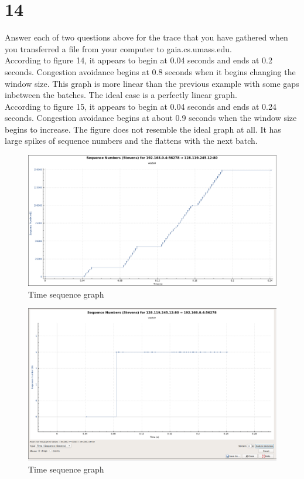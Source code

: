 \documentclass{article}
\begin{document}
\section*{14}
Answer each of two questions above for the trace that you have gathered when
you transferred a file from your computer to gaia.cs.umass.edu.\\
\newline According to figure 14, it appears to begin at 0.04 seconds and ends at 0.2 seconds.  Congestion avoidance begins at 0.8 seconds when it begins changing the window size.  This graph is more linear than the previous example with some gaps inbetween the batches.  The ideal case is a perfectly linear graph.\\
\newline According to figure 15, it appears to begin at 0.04 seconds and ends at 0.24 seconds.  Congestion avoidance begins at about 0.9 seconds when the window size begins to increase.  The figure does not resemble the ideal graph at all.  It has large spikes of sequence numbers and the flattens with the next batch.\\
\begin{figure}[h!]
\centering
\includegraphics[scale=0.30]{Q14a.png}
\caption{Time sequence graph}
\end{figure}
\begin{figure}[h!]
\centering
\includegraphics[scale=0.30]{Q14b.png}
\caption{Time sequence graph}
\end{figure}
\end{document}
